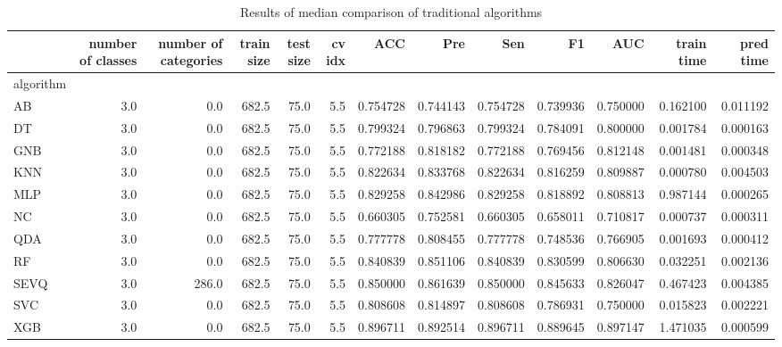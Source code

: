 \begin{table}[H]
\footnotesize
\centering
\caption{Results of median comparison of traditional algorithms}
\label{tab:Traditional comparison median}
\begin{tabular}{lrrrrrrrrrrrr}
\hline
{} &  number of classes &  number of categories &  train size &  test size &  cv idx &  ACC &  Pre &    Sen &        F1 &       AUC &  train time &  pred time \\
\hline
algorithm &                    &                       &             &            &         &           &            &           &           &           &             &            \\
AB        &                3.0 &                   0.0 &       682.5 &       75.0 &     5.5 &  0.754728 &   0.744143 &  0.754728 &  0.739936 &  0.750000 &    0.162100 &   0.011192 \\
DT        &                3.0 &                   0.0 &       682.5 &       75.0 &     5.5 &  0.799324 &   0.796863 &  0.799324 &  0.784091 &  0.800000 &    0.001784 &   0.000163 \\
GNB       &                3.0 &                   0.0 &       682.5 &       75.0 &     5.5 &  0.772188 &   0.818182 &  0.772188 &  0.769456 &  0.812148 &    0.001481 &   0.000348 \\
KNN       &                3.0 &                   0.0 &       682.5 &       75.0 &     5.5 &  0.822634 &   0.833768 &  0.822634 &  0.816259 &  0.809887 &    0.000780 &   0.004503 \\
MLP       &                3.0 &                   0.0 &       682.5 &       75.0 &     5.5 &  0.829258 &   0.842986 &  0.829258 &  0.818892 &  0.808813 &    0.987144 &   0.000265 \\
NC        &                3.0 &                   0.0 &       682.5 &       75.0 &     5.5 &  0.660305 &   0.752581 &  0.660305 &  0.658011 &  0.710817 &    0.000737 &   0.000311 \\
QDA       &                3.0 &                   0.0 &       682.5 &       75.0 &     5.5 &  0.777778 &   0.808455 &  0.777778 &  0.748536 &  0.766905 &    0.001693 &   0.000412 \\
RF        &                3.0 &                   0.0 &       682.5 &       75.0 &     5.5 &  0.840839 &   0.851106 &  0.840839 &  0.830599 &  0.806630 &    0.032251 &   0.002136 \\
SEVQ      &                3.0 &                 286.0 &       682.5 &       75.0 &     5.5 &  0.850000 &   0.861639 &  0.850000 &  0.845633 &  0.826047 &    0.467423 &   0.004385 \\
SVC       &                3.0 &                   0.0 &       682.5 &       75.0 &     5.5 &  0.808608 &   0.814897 &  0.808608 &  0.786931 &  0.750000 &    0.015823 &   0.002221 \\
XGB       &                3.0 &                   0.0 &       682.5 &       75.0 &     5.5 &  0.896711 &   0.892514 &  0.896711 &  0.889645 &  0.897147 &    1.471035 &   0.000599 \\
\hline
\end{tabular}
\end{table}
